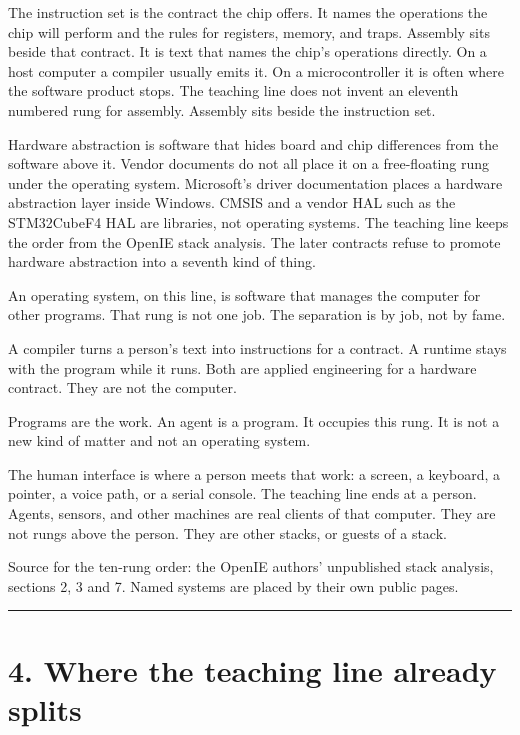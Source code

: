 \documentclass[10pt,letterpaper]{article}
\begin{document}
The instruction set is the contract the chip offers. It names the
operations the chip will perform and the rules for registers, memory,
and traps. Assembly sits beside that contract. It is text that names the
chip's operations directly. On a host computer a compiler usually emits
it. On a microcontroller it is often where the software product stops.
The teaching line does not invent an eleventh numbered rung for
assembly. Assembly sits beside the instruction set.

Hardware abstraction is software that hides board and chip differences
from the software above it. Vendor documents do not all place it on a
free-floating rung under the operating system. Microsoft's driver
documentation places a hardware abstraction layer inside Windows. CMSIS
and a vendor HAL such as the STM32CubeF4 HAL are libraries, not
operating systems. The teaching line keeps the order from the OpenIE
stack analysis. The later contracts refuse to promote hardware
abstraction into a seventh kind of thing.

An operating system, on this line, is software that manages the computer
for other programs. That rung is not one job. The separation is by job,
not by fame.

A compiler turns a person's text into instructions for a contract. A
runtime stays with the program while it runs. Both are applied
engineering for a hardware contract. They are not the computer.

Programs are the work. An agent is a program. It occupies this rung. It
is not a new kind of matter and not an operating system.

The human interface is where a person meets that work: a screen, a
keyboard, a pointer, a voice path, or a serial console. The teaching
line ends at a person. Agents, sensors, and other machines are real
clients of that computer. They are not rungs above the person. They are
other stacks, or guests of a stack.

Source for the ten-rung order: the OpenIE authors' unpublished stack
analysis, sections 2, 3 and 7. Named systems are placed by their own
public pages.

\begin{center}\rule{0.5\linewidth}{0.5pt}\end{center}

\section{4. Where the teaching line already
splits}\label{where-the-teaching-line-already-splits}
\end{document}
